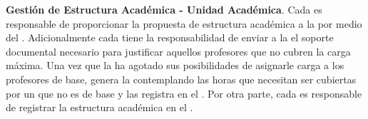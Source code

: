 \begin{ADescripcion}
	\item \textbf{Gestión de Estructura Académica - Unidad Académica}. Cada  es responsable de proporcionar la propuesta de estructura académica a la  por medio del . Adicionalmente cada  tiene la responsabilidad de enviar a la  el soporte documental necesario para justificar aquellos profesores que no cubren la carga máxima. Una vez que la  ha agotado sus posibilidades de asignarle carga a los profesores de base, genera la  contemplando las horas que necesitan ser cubiertas por un  que no es de base y las registra en el 	. Por otra parte, cada  es responsable de registrar la estructura académica en el .
	

\end{ADescripcion}
